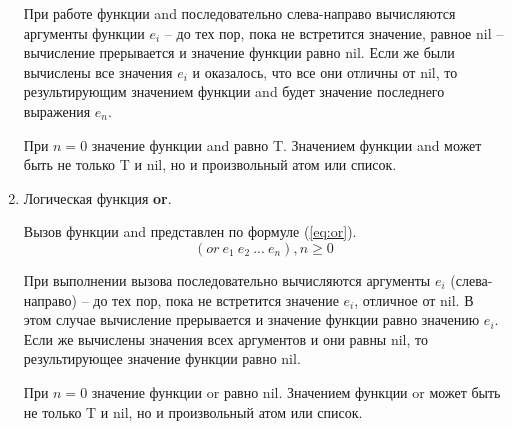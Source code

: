 \begin{enumerate}
При работе функции and последовательно слева-направо вычисляются аргументы функции $e_i$  -- до тех пор, пока не встретится значение, равное nil -- вычисление прерывается и значение функции равно nil. Если же были вычислены все значения $e_i$ и оказалось, что все они отличны от nil, то результирующим значением функции and будет значение последнего выражения $e_n$.

При $n=0$ значение функции and равно T. Значением функции and может быть не только T и nil, но и произвольный атом или список.

\item Логическая функция \textbf{or}.

Вызов функции and представлен по формуле (\ref{eq:or}).
\begin{equation}
	\label{eq:or}
	(or\ e_1\ e_2\ ...\ e_n), n \geq 0
\end{equation}

При выполнении вызова последовательно вычисляются аргументы $e_i$
(слева-направо) -- до тех пор, пока не встретится значение $e_i$, отличное от nil. В этом случае вычисление прерывается и значение функции равно значению $e_i$. Если же вычислены значения всех аргументов и они равны nil, то результирующее значение функции
равно nil.

При $n=0$ значение функции or равно nil. Значением функции or может быть не только T и nil, но и произвольный атом или список.

\end{enumerate}